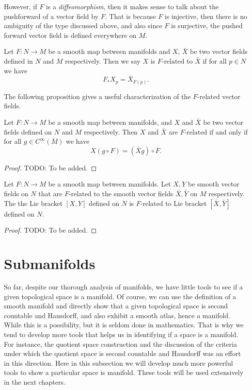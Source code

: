 However, if $ F $ is a \emph{diffeomorphism}, then it makes sense to talk about the pushforward of a vector field by $ F $. That is because $ F $ is injective, then there is no ambiguity of the type discussed above, and also since $ F $ is surjective, the pushed forward vector field is defined everywhere on $ M $.

\begin{definition}
	Let $ F: N \to M $ be a smooth map between manifolds and $ X $, $ \bar{X} $ be two vector fields defined in $ N $ and $ M $ respectively. Then we say $ X $ is $ F\text{-related} $ to $ \bar{X} $ if for all $ p \in N $ we have
	\[ F_* X_p = \bar{X}_{F(p)}. \] 
\end{definition}

The following proposition gives a useful characterization of the $ F\text{-related} $ vector fields.

\begin{proposition}
	Let $ F: N\to M $ be a smooth map between manifolds, and $ X $ and $ \bar{X} $ be two vector fields defined on $ N $ and $ M $ respectively. Then $ X $ and $ \bar{X} $ are $ F\text{-related} $ if and only if for all $ g \in C^\infty(M) $ we have
	\[ X(g\circ F) = (\bar{X} g) \circ F.  \]
\end{proposition}
\begin{proof}
	{\color{red} \noindent TODO: To be added.}
\end{proof}

\begin{proposition}
	Let $ F:N\to M $ be a smooth map between manifolds. Let $ X,Y $ be smooth vector fields on $ N $ that are $ F\text{-related} $ to the smooth vector fields $ \bar{X},\bar{Y} $ on $ M $ respectively. The the Lie bracket $ [X,Y] $ defined on $ N $ is $ F\text{-related} $ to Lie bracket $ [\bar{X},\bar{Y}]$ defined on $ N $.
\end{proposition}
\begin{proof}
	{\color{red} \noindent TODO: To be added.}
\end{proof}


\section{Submanifolds}
So far, despite our thorough analysis of manifolds, we have little tools to see if a given topological space is a manifold. Of course, we can use the definition of a smooth manifold and directly show that a given topological space is second countable and Hausdorff, and also exhibit a smooth atlas, hence a manifold. While this is a possibility, but it is seldom done in mathematics. That is why we tend to develop more tools that helps us in identifying if a space is a manifold. For instance, the quotient space construction and the discussion of the criteria under which the quotient space is second countable and Hausdorff was an effort in this direction. Here in this subsection we will develop much more powerful tools to show a particular space is manifold. These tools will be used extensively in the next chapters.



